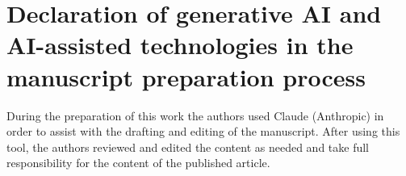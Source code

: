 \documentclass[preprint,12pt]{elsarticle}
\theoremstyle{definition}
\theoremstyle{remark}
\begin{document}
\section*{Declaration of generative AI and AI-assisted technologies
in the manuscript preparation process}
During the preparation of this work the authors used Claude
(Anthropic) in order to assist with the drafting and editing of the
manuscript. After using this tool, the authors reviewed and edited
the content as needed and take full responsibility for the content of
the published article.



\end{document}
